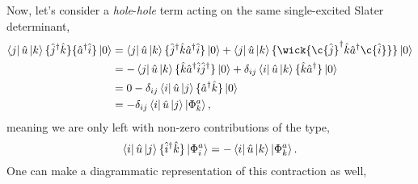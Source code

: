 	Now, let's consider a \emph{hole}-\emph{hole} term acting on the same single-excited Slater determinant,
	\begin{equation}
		\begin{aligned}
		\bra{j} \hat{u} \ket{k}\{ \hat{j}^\dagger \hat{k} \} \{ \hat{a}^\dagger \hat{i} \} \ket{0}
			&= \bra{j} \hat{u} \ket{k} \{ \hat{j}^\dagger \hat{k} \hat{a}^\dagger \hat{i} \} \ket{0}
			+   \bra{j} \hat{u} \ket{k} \{\wick{ \c{\hat{j}}^\dagger \hat{k} \hat{a}^\dagger \c{\hat{i}} } \} \ket{0} \\
			&= -\bra{j} \hat{u} \ket{k} \{ \hat{k} \hat{a}^\dagger \hat{i} \hat{j}^\dagger \} \ket{0}
			+     \delta_{ij}\bra{i} \hat{u} \ket{k} \{\hat{k} \hat{a}^\dagger \} \ket{0} \\
			&= 0 - \delta_{ij}\bra{i} \hat{u} \ket{j}\{ \hat{a}^\dagger \hat{k} \} \ket{0} \\
			&= - \delta_{ij} \bra{i} \hat{u} \ket{j} \ket{\Phi_k^a},
		\end{aligned}
	\end{equation}
	meaning we are only left with non-zero contributions of the type,
	\begin{equation}
		\bra{i} \hat{u} \ket{j}\{ \hat{i}^\dagger \hat{k} \} \ket{\Phi_i^a} = - \bra{i}\hat{u}\ket{k} \ket{\Phi_k^a}.
	\end{equation}
	One can make a diagrammatic representation of this contraction as well,
